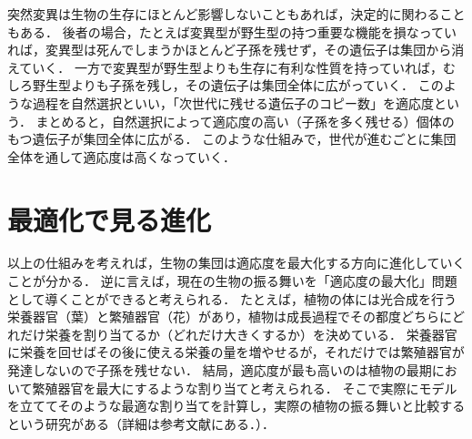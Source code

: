 突然変異は生物の生存にほとんど影響しないこともあれば，決定的に関わることもある．
後者の場合，たとえば変異型が野生型の持つ重要な機能を損なっていれば，変異型は死んでしまうかほとんど子孫を残せず，その遺伝子は集団から消えていく．
一方で変異型が野生型よりも生存に有利な性質を持っていれば，むしろ野生型よりも子孫を残し，その遺伝子は集団全体に広がっていく．
このような過程を自然選択といい，「次世代に残せる遺伝子のコピー数」を適応度という．
まとめると，自然選択によって適応度の高い（子孫を多く残せる）個体のもつ遺伝子が集団全体に広がる．
このような仕組みで，世代が進むごとに集団全体を通して適応度は高くなっていく．


\section{最適化で見る進化}
以上の仕組みを考えれば，生物の集団は適応度を最大化する方向に進化していくことが分かる．
逆に言えば，現在の生物の振る舞いを「適応度の最大化」問題として導くことができると考えられる．
たとえば，植物の体には光合成を行う栄養器官（葉）と繁殖器官（花）があり，植物は成長過程でその都度どちらにどれだけ栄養を割り当てるか（どれだけ大きくするか）を決めている．
栄養器官に栄養を回せばその後に使える栄養の量を増やせるが，それだけでは繁殖器官が発達しないので子孫を残せない．
結局，適応度が最も高いのは植物の最期において繁殖器官を最大にするような割り当てと考えられる．
そこで実際にモデルを立ててそのような最適な割り当てを計算し，実際の植物の振る舞いと比較するという研究がある（詳細は参考文献\cite{text}にある．）．